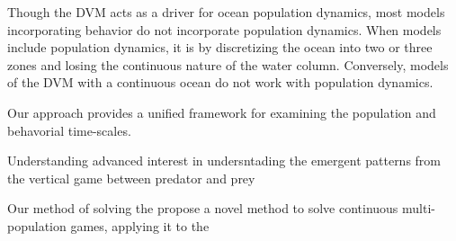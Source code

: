 Though the DVM acts as a driver for ocean population dynamics, most models incorporating behavior do not incorporate population dynamics. When models include population dynamics, it is by discretizing the ocean into two or three zones and losing the continuous nature of the water column. Conversely, models of the DVM with a continuous ocean do not work with population dynamics. 



Our approach provides a unified framework for examining the population and behavorial time-scales.



Understanding advanced interest in undersntading the emergent patterns from the vertical game between predator and prey




%
Our method of solving the propose a novel method to solve continuous multi-population games, applying it to the
